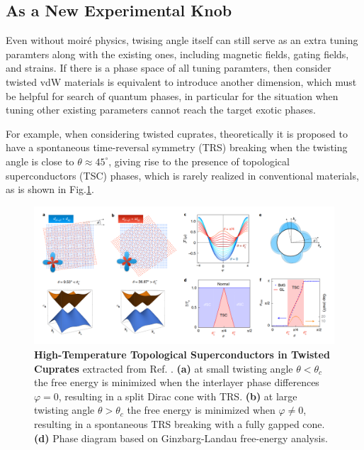 \subsection{As a New Experimental Knob}
Even without moir\'e physics, twising angle itself can still serve as an extra tuning paramters along with the existing ones, including magnetic fields, gating fields, and strains. If there is a phase space of all tuning paramters, then consider twisted vdW materials is equivalent to introduce another dimension, which must be helpful for search of quantum phases, in particular for the situation when tuning other existing parameters cannot reach the target exotic phases.

For example, when considering twisted cuprates, theoretically it is proposed to have a spontaneous time-reversal symmetry (TRS) breaking when the twisting angle is close to $\theta\approx45^\circ$, giving rise to the presence of topological superconductors (TSC) phases, which is rarely realized in conventional materials, as is shown in Fig.\ref{fig:high-T_topo_SC}.
\begin{figure}[!htp]
    \centering
    \includegraphics[width=1.0\textwidth]{figures/Introduction/high-T_topo_SC.png}
    \caption{\textbf{High-Temperature Topological Superconductors in Twisted Cuprates} extracted from Ref. \cite{can2021high}. \textbf{(a)} at small twisting angle $\theta<\theta_c$ the free energy is minimized when the interlayer phase differences $\varphi=0$, resulting in a split Dirac cone with TRS. \textbf{(b)} at large twisting angle $\theta>\theta_c$ the free energy is minimized when $\varphi\neq0$, resulting in a spontaneous TRS breaking with a fully gapped cone. \textbf{(d)} Phase diagram based on Ginzbarg-Landau free-energy analysis.}
    \label{fig:high-T_topo_SC}
\end{figure}


